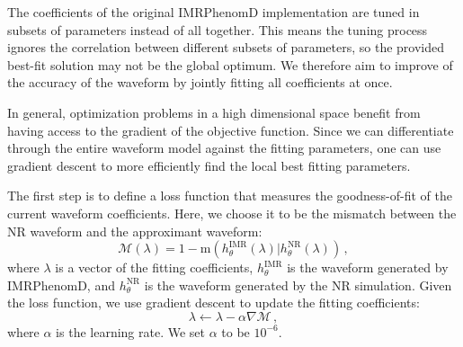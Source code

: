 \documentclass[twocolumn]{aastex631}
\newcommand{\te}[1]{\textbf{\color{pyGreen}(TE: #1)}}
\newcommand{\AZ}[1]{{\color{Burnt}[AZ: #1]}}
\newcommand{\mi}[1]{\textbf{\color{teal}(MI: #1)}}
\newcommand{\dfm}[1]{{\color{dfm}[DFM: #1]}}
\newcommand{\amc}[1]{{\color{red}[AC: #1]}}
\begin{document}
The coefficients of the original IMRPhenomD implementation are tuned in subsets of parameters instead of all together. 
This means the tuning process ignores the correlation between different subsets of parameters, so the provided best-fit solution may not be the global optimum. 
We therefore aim to improve of the accuracy of the waveform by jointly fitting all coefficients at once.


In general, optimization problems in a high dimensional space benefit from having access to the gradient of the objective function. 
Since we can differentiate through the entire waveform model against the fitting parameters, one can use gradient descent to more efficiently find the local best fitting parameters.

The first step is to define a loss function that measures the goodness-of-fit of the current waveform coefficients.
Here, we choose it to be the mismatch between the NR waveform and the approximant waveform:
\begin{equation}
    \label{eq:mismatch}
	\mathcal{M}(\lambda)=1-\mathrm{m}(h_{\theta}^{\mathrm{IMR}}(\lambda)|h_{\theta}^{\mathrm{NR}}(\lambda))\,,
\end{equation}
where $\lambda$ is a vector of the fitting coefficients, $h_{\theta}^{\mathrm{IMR}}$ is
the waveform generated by IMRPhenomD, and $h_{\theta}^{\mathrm{NR}}$ is the waveform
generated by the NR simulation. 
Given the loss function, we use gradient descent to update the fitting
coefficients:
\begin{equation}
	\lambda\leftarrow\lambda-\alpha\nabla\mathcal{M}\,, 
\end{equation}
where $\alpha$ is the learning rate. We set $\alpha$ to be $10^{-6}$. 
\end{document}
